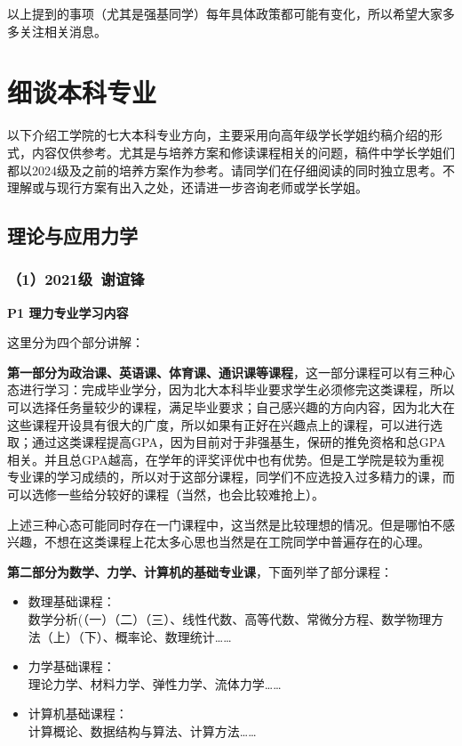 \documentclass[11pt,oneside]{book}
\begin{document}
以上提到的事项（尤其是强基同学）每年具体政策都可能有变化，所以希望大家多多关注相关消息。


\section{细谈本科专业}
以下介绍工学院的七大本科专业方向，主要采用向高年级学长学姐约稿介绍的形式，内容仅供参考。尤其是与培养方案和修读课程相关的问题，稿件中学长学姐们都以2024级及之前的培养方案作为参考。请同学们在仔细阅读的同时独立思考。不理解或与现行方案有出入之处，还请进一步咨询老师或学长学姐。
\subsection{理论与应用力学}
\subsubsection{（1）2021级\ 谢谊锋}
\textbf{P1 理力专业学习内容}

这里分为四个部分讲解：

\vspace{10pt}

\textbf{第一部分为政治课、英语课、体育课、通识课等课程}，这一部分课程可以有三种心态进行学习：完成毕业学分，因为北大本科毕业要求学生必须修完这类课程，所以可以选择任务量较少的课程，满足毕业要求；自己感兴趣的方向内容，因为北大在这些课程开设具有很大的广度，所以如果有正好在兴趣点上的课程，可以进行选取；通过这类课程提高GPA，因为目前对于非强基生，保研的推免资格和总GPA相关。并且总GPA越高，在学年的评奖评优中也有优势。但是工学院是较为重视专业课的学习成绩的，所以对于这部分课程，同学们不应选投入过多精力的课，而可以选修一些给分较好的课程（当然，也会比较难抢上）。

\vspace{10pt}

上述三种心态可能同时存在一门课程中，这当然是比较理想的情况。但是哪怕不感兴趣，不想在这类课程上花太多心思也当然是在工院同学中普遍存在的心理。

\vspace{10pt}

\textbf{第二部分为数学、力学、计算机的基础专业课}，下面列举了部分课程：
\begin{itemize}
	\item 数理基础课程：\\数学分析(（一）（二）（三）、线性代数、高等代数、常微分方程、数学物理方法（上）（下）、概率论、数理统计……
	\item 力学基础课程：\\理论力学、材料力学、弹性力学、流体力学……
	\item 计算机基础课程：\\计算概论、数据结构与算法、计算方法……
\end{itemize}
\end{document}

